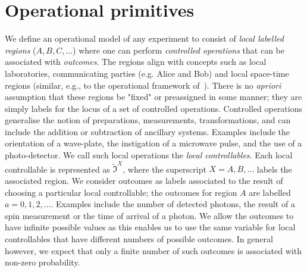 \documentclass[a4paper,onecolumn,11pt,accepted=2018-05-04]{quantumarticle}
\begin{document}
\section{Operational primitives}\label{opPrimitives}

We define an operational model of any experiment to consist of \emph{local labelled regions} ($A, B, C,\dots$) where one can perform \emph{controlled operations} that can be associated with \emph{outcomes}. The regions align with concepts such as local laboratories, communicating parties (e.g. Alice and Bob) and local space-time regions (similar, e.g., to the operational framework of~\cite{oreshkov15}). There is no \emph{apriori} assumption that these regions be "fixed" or preassigned in some manner; they are simply labels for the locus of a set of controlled operations. Controlled operations generalise the notion of preparations, measurements, transformations, and can include the addition or subtraction of ancillary systems. Examples include the orientation of a wave-plate, the instigation of a microwave pulse, and the use of a photo-detector. We call such local operations the \emph{local controllables}.  Each local controllable is represented as $\tilde{\mathcal{\mathfrak{I}}}^X$, where the superscript $X= A, B,\dots$ labels the associated region. We consider outcomes as labels associated to the result of choosing a particular local controllable; the outcomes for region $A$ are labelled $a=0,1,2,\dots$. Examples include the number of detected photons, the result of a spin measurement or the time of arrival of a photon. We allow the outcomes to have infinite possible values as this enables us to use the same variable for local controllables that have different numbers of possible outcomes.  In general however, we expect that only a finite number of such outcomes is associated with non-zero probability.
\end{document}
